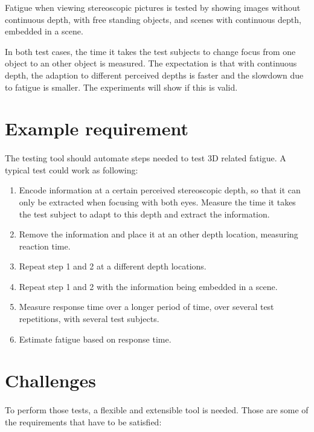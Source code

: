 \documentclass[11pt]{scrartcl}
\begin{document}
\begin{multicols}{2}
Fatigue when viewing stereoscopic pictures is tested by showing images without continuous depth, with free standing objects, and scenes with continuous depth, embedded in a scene.

In both test cases, the time it takes the test subjects to change focus from one object to an other object is measured. The expectation is that with continuous depth, the adaption to different perceived depths is faster and the slowdown due to fatigue is smaller. The experiments will show if this is valid.

\section{Example requirement}
\paragraph{}
The testing tool should automate steps needed to test 3D related fatigue. A typical test could work as following:

\begin{enumerate}
\item Encode information at a certain perceived stereoscopic depth, so that it can only be extracted when focusing with both eyes. Measure the time it takes the test subject to adapt to this depth and extract the information.
\item Remove the information and place it at an other depth location, measuring reaction time.
\item Repeat step 1 and 2 at a different depth locations.
\item Repeat step 1 and 2 with the information being embedded in a scene.
\item Measure response time over a longer period of time, over several test repetitions, with several test subjects.
\item Estimate fatigue based on response time.
\end{enumerate}

\section{Challenges}
\paragraph{}
To perform those tests, a flexible and extensible tool is needed. Those are some of the requirements that have to be satisfied:


\end{multicols}
\end{document}
